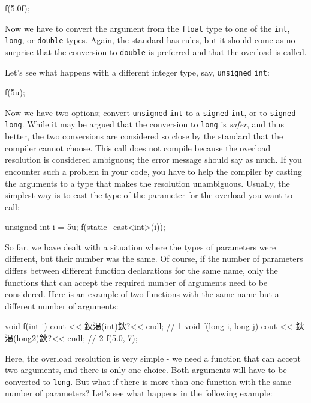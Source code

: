 \begin{code}
f(5.0f);
\end{code}

Now we have to convert the argument from the \texttt{float} type to one of the \texttt{int}, \texttt{long}, or \texttt{double} types. Again, the standard has rules, but it should come as no surprise that the conversion to \texttt{double} is preferred and that the overload is called.

Let's see what happens with a different integer type, say, \texttt{unsigned} \texttt{int}:

\begin{code}
f(5u);
\end{code}

Now we have two options; convert \texttt{unsigned} \texttt{int} to a \texttt{signed} \texttt{int}, or to \texttt{signed} \texttt{long}. While it may be argued that the conversion to \texttt{long} is \emph{safer}, and thus better, the two conversions are considered so close by the standard that the compiler cannot choose. This call does not compile because the overload resolution is considered ambiguous; the error message should say as much. If you encounter such a problem in your code, you have to help the compiler by casting the arguments to a type that makes the resolution unambiguous. Usually, the simplest way is to cast the type of the parameter for the overload you want to call:

\begin{code}
unsigned int i = 5u;
f(static_cast<int>(i));
\end{code}

So far, we have dealt with a situation where the types of parameters were different, but their number was the same. Of course, if the number of parameters differs between different function declarations for the same name, only the functions that can accept the required number of arguments need to be considered. Here is an example of two functions with the same name but a different number of arguments:

\begin{code}
void f(int i) { cout << 鈥渇(int)鈥?<< endl; }            // 1
void f(long i, long j) { cout << 鈥渇(long2)鈥?<< endl; }    // 2
f(5.0, 7);
\end{code}

Here, the overload resolution is very simple - we need a function that can accept two arguments, and there is only one choice. Both arguments will have to be converted to \texttt{long}. But what if there is more than one function with the same number of parameters? Let's see what happens in the following example:

